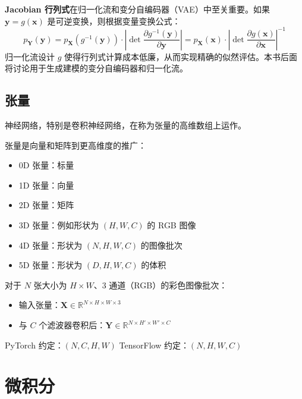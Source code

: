 \textbf{Jacobian 行列式}在归一化流和变分自编码器（VAE）中至关重要。如果 $\mathbf{y} = g(\mathbf{x})$ 是可逆变换，则根据变量变换公式：
\begin{equation}
p_{\mathbf{Y}}(\mathbf{y}) = p_{\mathbf{X}}(g^{-1}(\mathbf{y})) \cdot \left|\det \frac{\partial g^{-1}(\mathbf{y})}{\partial \mathbf{y}}\right| = p_{\mathbf{X}}(\mathbf{x}) \cdot \left|\det \frac{\partial g(\mathbf{x})}{\partial \mathbf{x}}\right|^{-1}
\end{equation}
归一化流设计 $g$ 使得行列式计算成本低廉，从而实现精确的似然评估。本书后面将讨论用于生成建模的变分自编码器和归一化流。

\subsection{张量}

神经网络，特别是卷积神经网络，在称为张量的高维数组上运作。

\begin{定义}[张量]
张量是向量和矩阵到更高维度的推广：
\begin{itemize}
    \item 0D 张量：标量
    \item 1D 张量：向量
    \item 2D 张量：矩阵
    \item 3D 张量：例如形状为 $(H, W, C)$ 的 RGB 图像
    \item 4D 张量：形状为 $(N, H, W, C)$ 的图像批次
    \item 5D 张量：形状为 $(D, H, W, C)$ 的体积
\end{itemize}
\end{定义}

\begin{示例}
对于 $N$ 张大小为 $H \times W$、3 通道（RGB）的彩色图像批次：
\begin{itemize}
    \item 输入张量：$\mathbf{X} \in \mathbb{R}^{N \times H \times W \times 3}$
    \item 与 $C$ 个滤波器卷积后：$\mathbf{Y} \in \mathbb{R}^{N \times H' \times W' \times C}$
\end{itemize}
PyTorch 约定：$(N, C, H, W)$
TensorFlow 约定：$(N, H, W, C)$
\end{示例}

\section{微积分}

